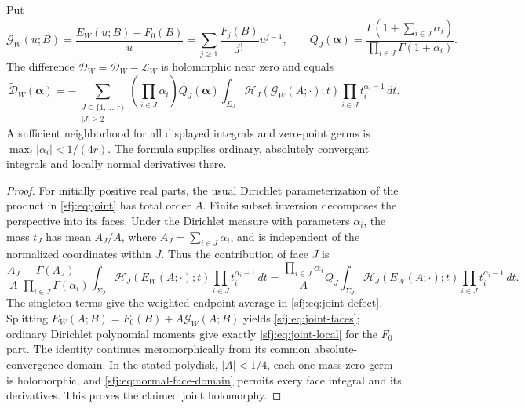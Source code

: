 \begin{theorem}
\label{sfj:thm:joint-faces}
Put
\[
 \mathcal G_W(u;B)=\frac{E_W(u;B)-F_0(B)}u
       =\sum_{j\ge1}\frac{F_j(B)}{j!}u^{j-1},
 \qquad
 Q_J(\boldsymbol\alpha)=
 \frac{\Gamma(1+\sum_{i\in J}\alpha_i)}
                      {\prod_{i\in J}\Gamma(1+\alpha_i)}.
\]
The difference $\widetilde{\mathscr D}_W=
\mathscr D_W-\mathscr L_W$ is holomorphic near zero and equals
\begin{equation}\label{sfj:eq:joint-faces}
 \boxed{\displaystyle
 \widetilde{\mathscr D}_W(\boldsymbol\alpha)
   =-\sum_{\substack{J\subseteq\{1,\ldots,r\}\\|J|\ge2}}
       \left(\prod_{i\in J}\alpha_i\right)Q_J(\boldsymbol\alpha)
       \int_{\Sigma_J}\mathcal H_J(\mathcal G_W(A;\cdot);t)
                              \prod_{i\in J}t_i^{\alpha_i-1}\,dt.}
\end{equation}
A sufficient neighborhood for all displayed integrals and zero-point
germs is $\max_i|\alpha_i|<1/(4r)$.  The formula supplies ordinary,
absolutely convergent integrals and locally normal derivatives there.
\end{theorem}

\begin{proof}
For initially positive real parts, the usual Dirichlet parameterization
of the product in \eqref{sfj:eq:joint} has total order $A$.
Finite subset inversion decomposes the perspective into its faces.
Under the Dirichlet measure with parameters $\alpha_i$, the mass
$t_J$ has mean $A_J/A$, where $A_J=\sum_{i\in J}\alpha_i$, and
is independent of the normalized coordinates within $J$.  Thus the
contribution of face $J$ is
\[
 \frac{A_J}{A}\frac{\Gamma(A_J)}{\prod_{i\in J}\Gamma(\alpha_i)}
 \int_{\Sigma_J}\mathcal H_J(E_W(A;\cdot);t)
                                         \prod_{i\in J}t_i^{\alpha_i-1}\,dt
 =\frac{\prod_{i\in J}\alpha_i}{A}Q_J
                    \int_{\Sigma_J}\mathcal H_J(E_W(A;\cdot);t)
                                         \prod_{i\in J}t_i^{\alpha_i-1}\,dt.
\]
The singleton terms give the weighted endpoint average in
\eqref{sfj:eq:joint-defect}.  Splitting $E_W(A;B)=F_0(B)+
A\mathcal G_W(A;B)$ yields \eqref{sfj:eq:joint-faces}; ordinary
Dirichlet polynomial moments give exactly \eqref{sfj:eq:joint-local}
for the $F_0$ part.  The identity continues meromorphically from its
common absolute-convergence domain.  In the stated polydisk,
$|A|<1/4$, each one-mass zero germ is holomorphic, and
\eqref{sfj:eq:normal-face-domain} permits every face integral and
its derivatives.  This proves the claimed joint holomorphy.
\end{proof}

